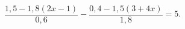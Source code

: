 \begin{ex}[type=equation]
	\begin{condition}
		$\dfrac{1,5 - 1,8(2x - 1)}{0,6} - \dfrac{0,4- 1,5(3+4x)}{1,8} = 5.$
	\end{condition}
\end{ex}